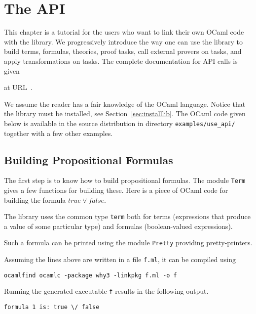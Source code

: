 \chapter{The \why API}
\label{chap:api}

This chapter is a tutorial for the users who want to link their own
OCaml code with the \why library. We progressively introduce the way
one can use the library to build terms, formulas, theories, proof
tasks, call external provers on tasks, and apply transformations on
tasks. The complete documentation for API calls is given\begin{latexonly}
at URL~\urlapi{}.\end{latexonly}

We assume the reader has a fair knowledge of the OCaml
language. Notice that the \why library must be installed, see
Section~\ref{sec:installlib}. The OCaml code given below is available in
the source distribution in directory \verb|examples/use_api/| together
with a few other examples.


\section{Building Propositional Formulas}
\label{sec:prop_form}

The first step is to know how to build propositional formulas. The
module \texttt{Term} gives a few functions for building these. Here is
a piece of OCaml code for building the formula $\mathit{true} \lor
\mathit{false}$.

The library uses the common type \texttt{term} both for terms
(\ie expressions that produce a value of some particular type)
and formulas (\ie boolean-valued expressions).

Such a formula can be printed using the module \texttt{Pretty}
providing pretty-printers.


Assuming the lines above are written in a file \texttt{f.ml}, it can
be compiled using
\begin{verbatim}
ocamlfind ocamlc -package why3 -linkpkg f.ml -o f
\end{verbatim}
Running the generated executable \texttt{f} results in the following output.
\begin{verbatim}
formula 1 is: true \/ false
\end{verbatim}


